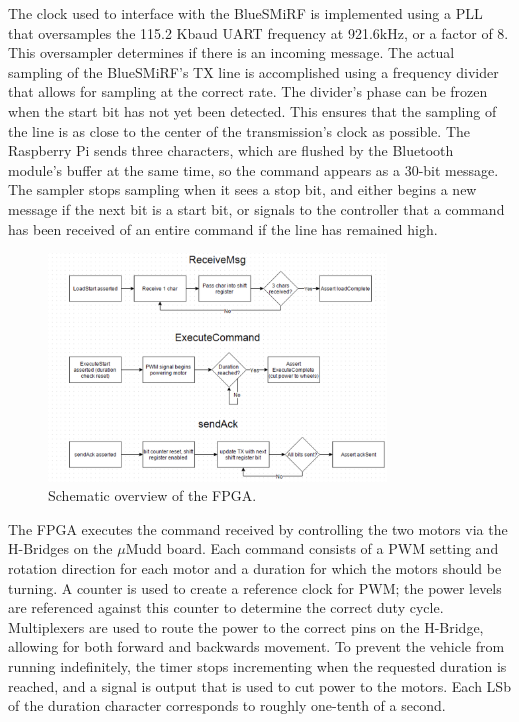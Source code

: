 \documentclass[12pt]{article}
\begin{document}
The clock used to interface with the BlueSMiRF is implemented using a PLL that oversamples the 115.2 Kbaud UART frequency at 921.6kHz, or a factor of 8.  This oversampler determines if there is an incoming message.  The actual sampling of the BlueSMiRF's TX line is accomplished using a frequency divider that allows for sampling at the correct rate.  The divider's phase can be frozen when the start bit has not yet been detected.  This ensures that the sampling of the line is as close to the center of the transmission's clock as possible.  The Raspberry Pi sends three characters, which are flushed by the Bluetooth module's buffer at the same time, so the command appears as a 30-bit message.  The sampler stops sampling when it sees a stop bit, and either begins a new message if the next bit is a start bit, or signals to the controller that a command has been received of an entire command if the line has remained high.

\begin{figure}
\begin{center}
\includegraphics[width=0.8\textwidth]{FPGABlock}
\end{center}
\caption{Schematic overview of the FPGA.}
\label{fig:fpgablock}
\end{figure}

The FPGA executes the command received by controlling the two motors via the H-Bridges on the $\mu$Mudd board. Each command consists of a PWM setting and rotation direction for each motor and a duration for which the motors should be turning.  A counter is used to create a reference clock for PWM; the power levels are referenced against this counter to determine the correct duty cycle.  Multiplexers are used to route the power to the correct pins on the H-Bridge, allowing for both forward and backwards movement.  To prevent the vehicle from running indefinitely, the timer stops incrementing when the requested duration is reached, and a signal is output that is used to cut power to the motors.  Each LSb of the duration character corresponds to roughly one-tenth of a second.
\end{document}
